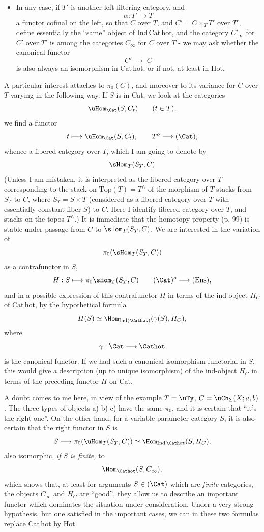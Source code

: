 \begin{itemize}[leftmargin=2.5em]
\item[\circled{d}] In any case, if $T'$ is another left filtering category, and
\[
\alpha : T' \longrightarrow T
\]
a functor cofinal on the left, so that $C$ over $T$, and $C' = C \times_{T} T'$ over $T'$, define essentially the ``same'' object of Ind\,Cat\,hot, and the category $C'_{\infty}$ for $C'$ over $T'$ is among the categories $C_{\infty}$ for $C$ over $T$ - we may ask
whether the canonical functor
\[
C' \;\longrightarrow\; C
\]
is also always an isomorphism in Cat\,hot, or if not, at least in Hot.
\end{itemize}

A particular interest attaches to $\pi_{0}(C)$, and moreover to its variance for $C$ over $T$ varying in the following way. If $S$ is in Cat, we look at the categories
\[
\uHom_{\Cat}(S,C_{t}) \qquad (t \in T),
\]
we find a functor
\[
t \longmapsto \uHom_{\Cat}(S,C_{t}), \qquad T^{o} \longrightarrow (\Cat),
\]
whence a fibered category over $T$, which I am going to denote by
\[
\sHom_{T}(S_{T},C)
\]
(Unless I am mistaken, it is interpreted as the fibered category over $T$ corresponding to the stack on $\mathrm{Top}(T) = T^{\wedge}$ of the morphism of $T$-stacks from $S_{T}$ to $C$, where $S_{T} = S \times T$ (considered as a fibered category over $T$ with essentially constant fiber $S$) to $C$. Here I identify fibered category over $T$, and stacks on the topos $T^{\wedge}$.) It is immediate that the homotopy property (p. 99) is stable under passage from $C$ to $\sHom_{T}(S_{T},C)$. We are interested in the variation of
\[
\pi_{0}(\sHom_{T}(S_{T},C))
\]
as a contrafunctor in $S$,
\[
H : S \longmapsto \pi_{0}\sHom_{T}(S_{T},C) \qquad (\Cat)^{o} \longrightarrow (\mathrm{Ens}),
\]
and in a possible expression of this contrafunctor $H$ in terms of the ind-object $H_{C}$ of Cat\,hot, by the hypothetical formula
\[
H(S) \simeq \Hom_{\mathrm{Ind}(\Cathot)}(\gamma(S),H_{C}),
\]
where
\[
\gamma : \Cat \longrightarrow \Cathot
\]
is the canonical functor. If we had such a canonical isomorphism functorial in $S$, this would give a description (up to unique isomorphism) of the ind-object $H_{C}$ in terms of the preceding functor $H$ on Cat.

A doubt comes to me here, in view of the example $T = \uTy$, $C = \uCh_{\Sigma}(X;a,b)$. The three types of objects a) b) c) have the same $\pi_{0}$, and it is certain that ``it's the right one''. On the other hand, for a variable parameter category $S$, it is also certain that the right functor in $S$ is
\[
S \longmapsto \pi_{0}(\uHom_{T}(S_{T},C)) \simeq \Hom_{\mathrm{Ind}\,\Cathot}(S,H_{C}),
\]
also isomorphic, \textit{if $S$ is finite,} to
\[
\Hom_{\Cathot}(S,C_{\infty}),
\]
which shows that, at least for arguments $S \in (\Cat)$ which are \textit{finite} categories, the objects
$C_{\infty}$ and $H_{C}$ are ``good'', they allow us %
to describe an important functor which dominates the situation under consideration. Under a very strong hypothesis, but one satisfied in the important cases, we can in these two formulas replace Cat\,hot by Hot.

